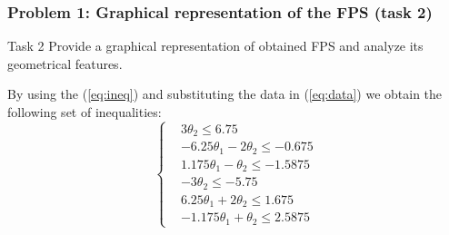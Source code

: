 \documentclass{beamer}
\begin{document}
\begin{frame}
    \frametitle{Problem 1: Graphical representation of the FPS (task 2)}
    \begin{alertblock}{Task 2}
        \justifying
        Provide a graphical representation of obtained FPS and analyze its geometrical features.
    \end{alertblock}
    By using the (\ref{eq:ineq}) and substituting the data in  (\ref{eq:data}) we obtain the following set of  inequalities: 
    \begin{equation}
        \begin{cases}
            &3\theta_2\le6.75\\
            &-6.25\theta_1-2\theta_2\le-0.675\\
            &1.175\theta_1-\theta_2\le-1.5875\\
            &-3\theta_2\le-5.75\\
            &6.25\theta_1+2\theta_2\le1.675\\
            &-1.175\theta_1+\theta_2\le2.5875
        \end{cases}
    \end{equation}
\end{frame}
\end{document}
